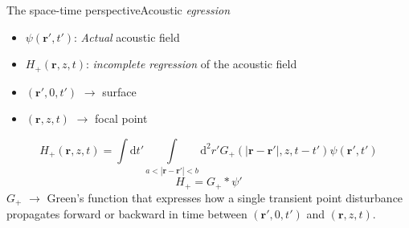 \documentclass{beamer}
\begin{document}
\begin{frame}{The space-time perspective}{Acoustic \emph{egression}}
    \begin{itemize}
        \item $\psi(\mathbf{r}',t')$: \emph{Actual} acoustic field
        \item $H_{+}(\mathbf{r},z,t)$:
            \emph{incomplete regression} of the acoustic field
        \item $(\mathbf{r}',0,t')$ $\rightarrow$ surface
        \item $(\mathbf{r},z,t)$ $\rightarrow$ focal point
    \end{itemize}
    $$ H_{+}(\mathbf{r},z,t) = \int
    \textrm{d}t' \int\limits_{a<|\mathbf{r}-\mathbf{r}'|<b}
    \textrm{d}^{2}r'G_{+}
    (|\mathbf{r}-\mathbf{r}'|,z,t-t')\psi(\mathbf{r}',t')  $$
    \textcolor{lemon}{$$ H_{+} = G_{+} * \psi{'} $$}
    \textcolor{pur}{$G_{+}$} $\rightarrow$
    Green's function that expresses how a single transient point
    disturbance propagates forward or backward in time between
    $(\mathbf{r}',0,t')$ and $(\mathbf{r},z,t)$.

\end{frame}
\end{document}
